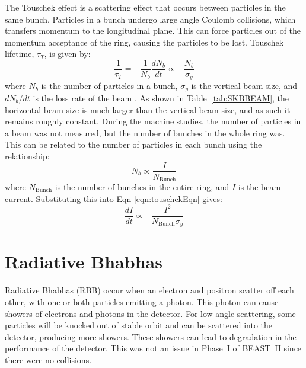 	The Touschek effect is a scattering effect that occurs between particles in the same bunch. Particles in a bunch undergo large angle Coulomb collisions, which transfers momentum to the longitudinal plane. This can force particles out of the momentum acceptance of the ring, causing the particles to be lost. Touschek lifetime, $\tau_{T}$, is given by:
\begin{equation}
	{\frac{1}{\tau_{T}} = -\frac{1}{N_{b}}\frac{dN_{b}}{dt} \propto -\frac{N_{b}}{\sigma_{y}}}
	\label{eqn:touschekEqn}
\end{equation}
where $N_{b}$ is the number of particles in a bunch, $\sigma_{y}$ is the vertical beam size, and $dN_{b}/dt$ is the loss rate of the beam \cite{Wolski}. As shown in Table~\ref{tab:SKBBEAM}, the horizontal beam size is much larger than the vertical beam size, and as such it remains roughly constant. During the machine studies, the number of particles in a beam was not measured, but the number of bunches in the whole ring was. This can be related to the number of particles in each bunch using the relationship:
\begin{equation}
	{N_{b} \propto\frac{I}{N_{\mathrm{Bunch}}}}
\end{equation}
where $N_{\mathrm{Bunch}}$ is the number of bunches in the entire ring, and $I$ is the beam current. Substituting this into Eqn \ref{eqn:touschekEqn} gives:
\begin{equation}
	{\frac{dI}{dt}\propto-\frac{I^2}{N_{\mathrm{Bunch}}\sigma_{y}}}
\end{equation}





\section{Radiative Bhabhas}

Radiative Bhabhas (RBB) occur when an electron and positron scatter off each other, with one or both particles emitting a photon. This photon can cause showers of electrons and photons in the detector. For low angle scattering, some particles will be knocked out of stable orbit and can be scattered into the detector, producing more showers. These showers can lead to degradation in the performance of the detector. This was not an issue in Phase~I of BEAST~II since there were no collisions.

